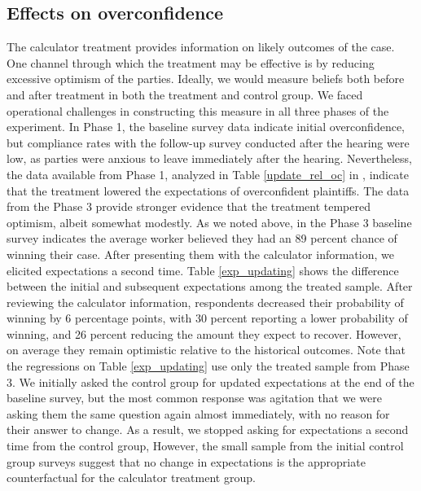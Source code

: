 \documentclass[11pt, a4paper]{article}
\begin{document}
\subsection{Effects on overconfidence}

The calculator treatment provides information on likely outcomes of the case. One channel through which the treatment may be effective is by reducing excessive optimism of the parties. Ideally, we would measure beliefs both before and after treatment in both the treatment and control group. We faced operational challenges in constructing this measure in all three phases of the experiment. In Phase 1, the baseline survey data indicate initial overconfidence, but compliance rates with the follow-up survey conducted after the hearing were low, as parties were anxious to leave immediately after the hearing. Nevertheless, the data available from Phase 1, analyzed in Table \ref{update_rel_oc} in , indicate that the treatment lowered the expectations of overconfident plaintiffs. The data from the Phase 3 provide stronger evidence that the treatment tempered optimism, albeit somewhat modestly. As we noted above, in the Phase 3 baseline survey indicates the average worker believed they had an 89 percent chance of winning their case. After presenting them with the calculator information, we elicited expectations a second time. Table \ref{exp_updating} shows the difference between the initial and subsequent expectations among the treated sample. After reviewing the calculator information, respondents decreased their probability of winning by 6 percentage points, with 30 percent reporting a lower probability of winning, and 26 percent reducing the amount they expect to recover. However, on average they remain optimistic relative to the historical outcomes. Note that the regressions on Table \ref{exp_updating} use only the treated sample from Phase 3. We initially asked the control group for updated expectations at the end of the baseline survey, but the most common response was agitation that we were asking them the same question again almost immediately, with no reason for their answer to change. As a result, we stopped asking for expectations a second time from the control group, However, the small sample from the initial control group surveys suggest that no change in expectations is the appropriate counterfactual for the calculator treatment group. 
\end{document}
